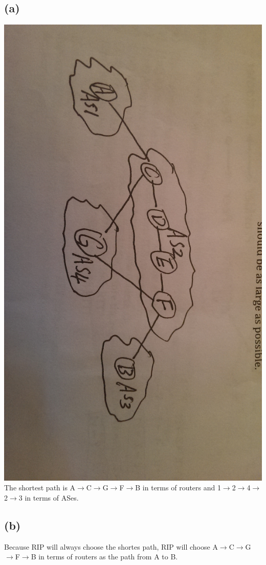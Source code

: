 \documentclass[11pt]{article}
\begin{document}
\subsection*{(a)}
\includegraphics[scale=0.08,angle=90]{hw2.jpg}\\
The shortest path is A$\to$C$\to$G$\to$F$\to$B in terms of routers and 1$\to$2$\to$4$\to$2$\to$3 in terms of ASes.
\subsection*{(b)}
Because RIP will always choose the shortes path, RIP will choose A$\to$C$\to$G$\to$F$\to$B in terms of routers as the path from A to B.
\end{document}
